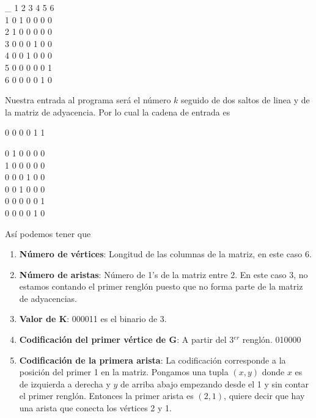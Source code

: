 \documentclass[12pt,letterpaper]{article}
\begin{document}
\begin{center}
\_ 1 2 3 4 5 6 \\
1  0 1 0 0 0 0 \\
2  1 0 0 0 0 0 \\
3  0 0 0 1 0 0 \\
4  0 0 1 0 0 0 \\
5  0 0 0 0 0 1 \\
6  0 0 0 0 1 0 \\
\end{center}
\newpage
Nuestra entrada al programa será el número $k$ seguido de dos saltos de linea y de la matriz de adyacencia. Por lo cual la cadena de entrada es
\begin{center}
0 0 0 0 1 1



0 1 0 0 0 0 \\
1 0 0 0 0 0 \\
0 0 0 1 0 0 \\
0 0 1 0 0 0 \\
0 0 0 0 0 1 \\
0 0 0 0 1 0 \\
\end{center}

Así podemos tener que

\begin{enumerate}
    \item \textbf{Número de vértices}: Longitud de las columnas de la matriz, en este caso 6.
    
    \item \textbf{Número de aristas}: Número de 1's de la matriz entre 2. En este caso 3, no estamos contando el primer renglón puesto que no forma parte de la matriz de adyacencias.
    
    \item \textbf{Valor de K}: 000011 es el binario de 3.
    
    \item \textbf{Codificación del primer vértice de G}: A partir del 3$^{er}$ renglón. 010000
    
    \item \textbf{Codificación de la primera arista}: La codificación corresponde a la posición del primer 1 en la matriz. Pongamos una tupla $(x,y)$ donde $x$ es de izquierda a derecha y $y$ de arriba abajo empezando desde el 1 y sin contar el primer renglón. Entonces la primer arista es $(2,1)$, quiere decir que hay una arista que conecta los vértices 2 y 1.
\end{enumerate}
\end{document}
